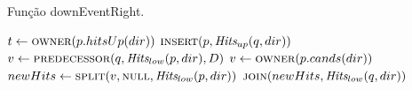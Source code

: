 \begin{algorithm}[H]
    \caption{Função downEventRight.} \label{alg:par-cinetico:eventodowncaso2}
    \begin{algorithmic}[1]
            \State $t \leftarrow \Call{owner}{p.hitsUp(dir)}$
                \State {}
            \EndIf
            \State $\Call{insert}{p, \Hits_{up}(q, dir)}$
            \State $v \leftarrow \Call{predecessor}{q, \Hits_{low}(p, dir), D}$
                \State $v \leftarrow \Call{owner}{p.cands(dir)}$
            \EndIf
            \State $newHits \leftarrow \Call{split}{v, \nnull, \Hits_{low}(p,dir)}$
            \State $\Call{join}{newHits, \Hits_{low}(q, dir)}$
            \State {}
                \State {}
            \EndIf
        \EndFunction
    \end{algorithmic}
\end{algorithm}